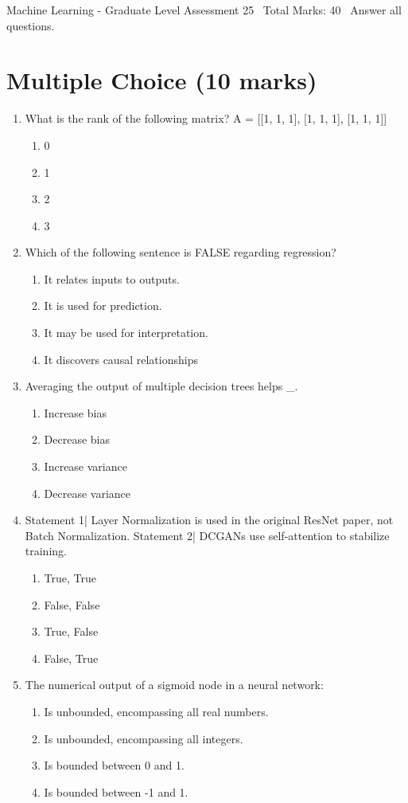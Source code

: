 \documentclass[12pt]{article}
\begin{document}
\begin{center}
Machine Learning - Graduate Level Assessment 25 \
Total Marks: 40 \
Answer all questions.
\end{center}

\section*{Multiple Choice (10 marks)}
\begin{enumerate}[label=\arabic*.]
\item What is the rank of the following matrix? A = [[1, 1, 1], [1, 1, 1], [1, 1, 1]]
\begin{enumerate}[label=(\alph*)]
    \item 0
    \item 1
    \item 2
    \item 3
\end{enumerate}
\item Which of the following sentence is FALSE regarding regression?
\begin{enumerate}[label=(\alph*)]
    \item It relates inputs to outputs.
    \item It is used for prediction.
    \item It may be used for interpretation.
    \item It discovers causal relationships
\end{enumerate}
\item Averaging the output of multiple decision trees helps \_.
\begin{enumerate}[label=(\alph*)]
    \item Increase bias
    \item Decrease bias
    \item Increase variance
    \item Decrease variance
\end{enumerate}
\item Statement 1| Layer Normalization is used in the original ResNet paper, not Batch Normalization. Statement 2| DCGANs use self-attention to stabilize training.
\begin{enumerate}[label=(\alph*)]
    \item True, True
    \item False, False
    \item True, False
    \item False, True
\end{enumerate}
\item The numerical output of a sigmoid node in a neural network:
\begin{enumerate}[label=(\alph*)]
    \item Is unbounded, encompassing all real numbers.
    \item Is unbounded, encompassing all integers.
    \item Is bounded between 0 and 1.
    \item Is bounded between -1 and 1.
\end{enumerate}
\end{enumerate}
\end{document}
